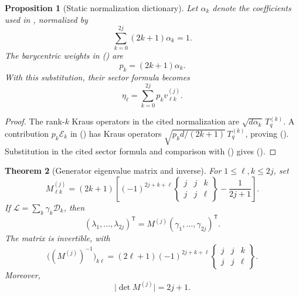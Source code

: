 \documentclass[twoside,10pt]{article}
\numberwithin{equation}{section}
\theoremstyle{slbody}
\newtheorem{theorem}{Theorem}[section]
\newtheorem{proposition}[theorem]{Proposition}
\theoremstyle{definition}
\theoremstyle{remark}
\newcommand{\cL}{\mathcal L}
\newcommand{\cD}{\mathcal D}
\newcommand{\cE}{\mathcal E}
\renewcommand{\eqref}[1]{%
  \textup{{\normalfont(\oldstylenums{\ref{#1}}}\normalfont)}}
\begin{document}
\begin{proposition}[Static normalization dictionary]
\label{prop:static-dictionary}
Let \(\alpha_k\) denote the coefficients used in
\cite[Eqs.~(26)--(31)]{RudnickiKlimovMunozLeuchsSanchezSoto2026},
normalized by
\begin{equation}\label{eq:rudnicki-normalization}
 \sum_{k=0}^{2j}(2k+1)\alpha_k=1.
\end{equation}
The barycentric weights in
\eqref{eq:channel-barycentric-decomposition} are
\begin{equation}\label{eq:static-weight-dictionary}
 p_k=(2k+1)\alpha_k.
\end{equation}
With this substitution, their sector formula
\cite[Eq.~(38)]{RudnickiKlimovMunozLeuchsSanchezSoto2026} becomes
\begin{equation}\label{eq:static-sector-dictionary}
 \eta_\ell=\sum_{k=0}^{2j}p_kv^{(j)}_{\ell k}.
\end{equation}
\end{proposition}

\begin{proof}
The rank-\(k\) Kraus operators in the cited normalization are
\(\sqrt{d\alpha_k}\,T_q^{(k)}\).  A contribution
\(p_k\cE_k\) in \eqref{eq:vertex-channel} has Kraus operators
\(\sqrt{p_kd/(2k+1)}\,T_q^{(k)}\), proving
\eqref{eq:static-weight-dictionary}.  Substitution in the cited
sector formula and comparison with \eqref{eq:vertex-eigenvalues} gives
\eqref{eq:static-sector-dictionary}.
\end{proof}

\begin{theorem}[Generator eigenvalue matrix and inverse]
\label{thm:eigenmatrix}
For \(1\leq\ell,k\leq2j\), set
\begin{equation}\label{eq:M-definition}
 M^{(j)}_{\ell k}
 =(2k+1)\left[(-1)^{2j+k+\ell}
 \begin{Bmatrix}j&j&k\\j&j&\ell\end{Bmatrix}
 -\frac1{2j+1}\right].
\end{equation}
If \(\cL=\sum_k\gamma_k\cD_k\), then
\begin{equation}\label{eq:lambda-M-gamma}
 (\lambda_1,\ldots,\lambda_{2j})^{\mathsf T}
 =M^{(j)}(\gamma_1,\ldots,\gamma_{2j})^{\mathsf T}.
\end{equation}
The matrix is invertible, with
\begin{equation}\label{eq:M-inverse-formula}
 \bigl((M^{(j)})^{-1}\bigr)_{k\ell}
 =(2\ell+1)(-1)^{2j+k+\ell}
 \begin{Bmatrix}j&j&k\\j&j&\ell\end{Bmatrix}.
\end{equation}
Moreover,
\begin{equation}\label{eq:M-determinant-magnitude}
 \bigl|\det M^{(j)}\bigr|=2j+1.
\end{equation}
\end{theorem}
\end{document}
